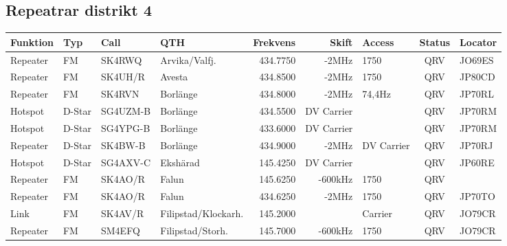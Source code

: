 \begin{landscape}
\subsection{Repeatrar distrikt 4}
\footnotesize
\begin{longtable}{llllrrlcl}
	\textbf{Funktion} & \textbf{Typ} & \textbf{Call} & \textbf{QTH}        & \textbf{Frekvens} & \textbf{Skift} & \textbf{Access} & \textbf{Status} & \textbf{Locator} \\ \hline
	\endhead
	Repeater          & FM           & SK4RWQ        & Arvika/Valfj.       &          434.7750 &          -2MHz & 1750            &       QRV       & JO69ES           \\
	Repeater          & FM           & SK4UH/R       & Avesta              &          434.8500 &          -2MHz & 1750            &       QRV       & JP80CD           \\
	Repeater          & FM           & SK4RVN        & Borlänge            &          434.8000 &          -2MHz & 74,4Hz          &       QRV       & JP70RL           \\
	Hotspot           & D-Star       & SG4UZM-B      & Borlänge            &          434.5500 &     DV Carrier &                 &       QRV       & JP70RM           \\
	Hotspot           & D-Star       & SG4YPG-B      & Borlänge            &          433.6000 &     DV Carrier &                 &       QRV       & JP70RM           \\
	Repeater          & D-Star       & SK4BW-B       & Borlänge            &          434.9000 &          -2MHz & DV Carrier      &       QRV       & JP70RJ           \\
	Hotspot           & D-Star       & SG4AXV-C      & Ekshärad            &          145.4250 &     DV Carrier &                 &       QRV       & JP60RE           \\
	Repeater          & FM           & SK4AO/R       & Falun               &          145.6250 &        -600kHz & 1750            &       QRV       &  \\
	Repeater          & FM           & SK4AO/R       & Falun               &          434.6250 &          -2MHz & 1750            &       QRV       & JP70TO           \\
	Link              & FM           & SK4AV/R       & Filipstad/Klockarh. &          145.2000 &                & Carrier         &       QRV       & JO79CR           \\
	Repeater          & FM           & SM4EFQ        & Filipstad/Storh.    &          145.7000 &        -600kHz & 1750            &       QRV       & JO79CR           \\

\end{longtable}
\end{landscape}

